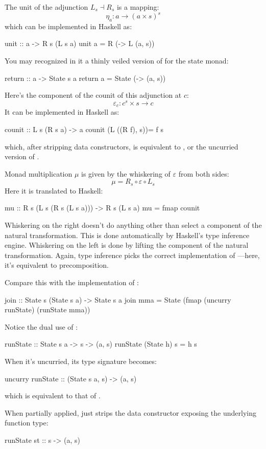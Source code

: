 \documentclass[DaoFP]{subfiles}
\begin{document}
The unit of the adjunction $L_s \dashv R_s$ is a mapping:
\[ \eta_a \colon a \to (a \times s)^s \]
which can be implemented in Haskell as:
\begin{haskell}
unit :: a -> R s (L s a)
unit a = R (\s -> L (a, s))
\end{haskell}
You may recognized in it a thinly veiled version of  for the state monad:
\begin{haskell}
return :: a -> State s a
return a = State (\s -> (a, s))
\end{haskell}

Here's the component of the counit of this adjunction at $c$:
\[ \varepsilon_c \colon c^s \times s \to c \]
It can be implemented in Haskell as:
\begin{haskell}
counit :: L s (R s a) -> a
counit (L ((R f), s))= f s
\end{haskell}
which, after stripping data constructors, is equivalent to , or the uncurried version of .

Monad multiplication $\mu$ is given by the whiskering of $\varepsilon$ from both sides:
\[ \mu = R_s \circ \varepsilon \circ L_s \]
Here it is translated to Haskell:
\begin{haskell}
mu :: R s (L s (R s (L s a))) -> R s (L s a)
mu = fmap counit
\end{haskell}
Whiskering on the right doesn't do anything other than select a component of the natural transformation. This is done automatically by Haskell's type inference engine. Whiskering on the left is done by lifting the component of the natural transformation. Again, type inference picks the correct implementation of ---here, it's equivalent to precomposition.

Compare this with the implementation of :
\begin{haskell}
join :: State s (State s a) -> State s a
join mma = State (fmap (uncurry runState) (runState mma))
\end{haskell}
Notice the dual use of : 
\begin{haskell}
runState :: State s a -> s -> (a, s)
runState (State h) s = h s
\end{haskell}
When it's uncurried, its type signature becomes:
\begin{haskell}
uncurry runState :: (State s a, s) -> (a, s)
\end{haskell}
which is equivalent to that of . 

When partially applied,  just strips the data constructor exposing the underlying function type:
\begin{haskell}
runState st :: s -> (a, s)
\end{haskell}
\end{document}
